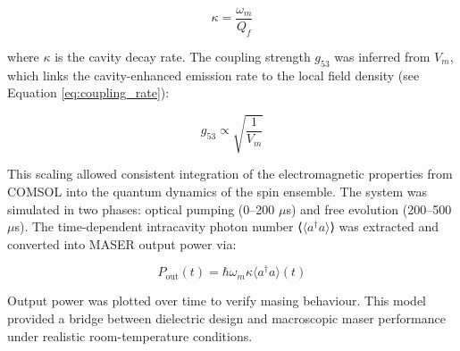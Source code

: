 \begin{equation}
  \kappa = \frac{\omega_m}{Q_f}
  \label{eq:kappa}
\end{equation}

where $\kappa$ is the cavity decay rate. The coupling strength $g_{53}$ was
inferred from $V_m$, which links the cavity-enhanced emission rate to the local
field density (see Equation \ref{eq:coupling_rate}):

\begin{equation}
  g_{53} \propto \sqrt{\frac{1}{V_m}}
  \label{eq:g53}
\end{equation}

This scaling allowed consistent integration of the electromagnetic properties
from COMSOL into the quantum dynamics of the spin ensemble.
The system was simulated in two phases: optical pumping (0–200 $\mu$s) and free
evolution (200–500 $\mu$s). The time-dependent intracavity photon number
⟨$\langle a^\dagger a \rangle$⟩ was extracted and converted into MASER output
power via:

\begin{equation}
  P_{\text{out}}(t) = \hbar \omega_m \kappa \langle a^\dagger a \rangle (t)
  \label{Pout}
\end{equation}

Output power was plotted over time to verify masing behaviour. This model
provided a bridge between dielectric design and macroscopic maser performance
under realistic room-temperature conditions.
